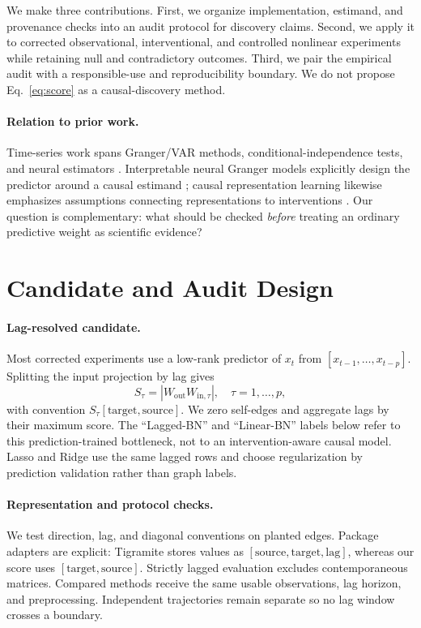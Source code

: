 \documentclass{article}
\begin{document}
We make three contributions. First, we organize implementation, estimand, and
provenance checks into an audit protocol for discovery claims. Second, we
apply it to corrected observational, interventional, and controlled nonlinear
experiments while retaining null and contradictory outcomes. Third, we pair
the empirical audit with a responsible-use and reproducibility boundary. We
do not propose Eq.~\ref{eq:score} as a causal-discovery method.

\paragraph{Relation to prior work.}
Time-series work spans Granger/VAR methods, conditional-independence tests,
and neural estimators
\citep{runge2019pcmci,tank2021neural,nauta2019causal,pamfil2020dynotears}.
Interpretable neural Granger models explicitly design the predictor around a
causal estimand \citep{marcinkevics2021interpretable}; causal representation
learning likewise emphasizes assumptions connecting representations to
interventions \citep{scholkopf2021toward}. Our question is complementary:
what should be checked \emph{before} treating an ordinary predictive weight
as scientific evidence?

\section{Candidate and Audit Design}

\paragraph{Lag-resolved candidate.}
Most corrected experiments use a low-rank predictor of $x_t$ from
$[x_{t-1},\ldots,x_{t-p}]$. Splitting the input projection by lag gives
\[
  S_\tau=\left|W_{\mathrm{out}}W_{\mathrm{in},\tau}\right|,
  \quad \tau=1,\ldots,p,
\]
with convention $S_\tau[\mathrm{target},\mathrm{source}]$. We zero
self-edges and aggregate lags by their maximum score. The ``Lagged-BN'' and
``Linear-BN'' labels below refer to this prediction-trained bottleneck, not
to an intervention-aware causal model. Lasso and Ridge use the same lagged
rows and choose regularization by prediction validation rather than graph
labels.

\paragraph{Representation and protocol checks.}
We test direction, lag, and diagonal conventions on planted edges. Package
adapters are explicit: Tigramite stores values as
$[\mathrm{source},\mathrm{target},\mathrm{lag}]$, whereas our score uses
$[\mathrm{target},\mathrm{source}]$. Strictly lagged evaluation excludes
contemporaneous matrices. Compared methods receive the same usable
observations, lag horizon, and preprocessing. Independent trajectories remain
separate so no lag window crosses a boundary.
\end{document}
